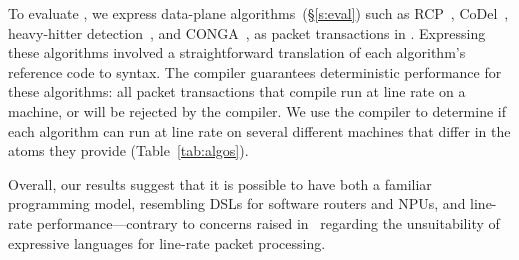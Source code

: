 To evaluate \pktlanguage, we express data-plane algorithms~(\S\ref{s:eval})
such as RCP~\cite{rcp}, CoDel~\cite{codel}, heavy-hitter
detection~\cite{opensketch}, and CONGA~\cite{conga}, as packet transactions in
\pktlanguage. Expressing these algorithms involved a straightforward
translation of each algorithm's reference code to \pktlanguage syntax.  The
\pktlanguage compiler guarantees deterministic performance for these
algorithms: all packet transactions that compile run at line rate on a
\absmachine machine, or will be rejected by the compiler.  We use the
\pktlanguage compiler to determine if each algorithm can run at line rate on
several different \absmachine machines that differ in the atoms they provide
(Table~\ref{tab:algos}).

Overall, our results suggest that it is possible to have both a familiar
programming model, resembling DSLs for software routers and NPUs, and line-rate
performance---contrary to concerns raised in~\cite{p4} regarding the
unsuitability of expressive languages for line-rate packet processing.
